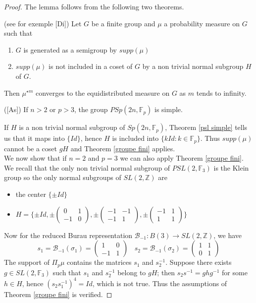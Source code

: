 \documentclass[12pt]{article}
\begin{document}
\begin{proof}
The lemma follows from the following two theorems. 
\begin{thm}\label{groupe fini}
	(see for exemple [Di])
	Let  $G$ be a finite group and $\mu$ a probability measure on $G$ such that 
	\begin{enumerate}
		\item 
$G$ is generated as a semigroup by 	$supp(\mu)$
\item $supp(\mu)$ is not included in a coset of $G$ by a non trivial normal subgroup $H$ of $G$.
\end{enumerate}
  Then $\mu^{\star m}$ converges to the equidistributed measure on $G$ as $m$ tends to infinity.
\end{thm}
\begin{thm}\label{psl simple} ([As]) If $n> 2$ or $p> 3$, the group $PSp(2n,{\mathbb{F}_p})$ is simple.
	\end{thm} 
If $H$ is a non trivial normal subgroup of $Sp(2n,\mathbb{F}_p)$, 
Theorem \ref{psl simple} tells us that it maps into $\{Id\}$, hence $H$ is included into $\{kId: k\in \mathbb{F}_p\}$. Thus $supp(\mu)$ cannot be a  coset $gH$ and Theorem \ref{groupe fini} applies.\\
We now show that if $n=2$ and $p=3$ we can also apply Theorem \ref{groupe fini}. We recall that the only non trivial normal subgroup of $PSL(2,\mathbb{F}_3)$ is the Klein group  so the only normal subgroups of $SL(2,\mathbb{Z})$ are 
\begin{itemize}
	\item the center $\{\pm Id\}$
	\item 
	$H=\{\pm Id, \pm\begin{pmatrix}
	0 & 1 \\
	-1 & 0 
	\end{pmatrix}, \pm\begin{pmatrix}
	-1 & -1 \\
	-1 & 1 
	\end{pmatrix}, \pm\begin{pmatrix}
	-1 & 1 \\
	1 & 1 
	\end{pmatrix}\}$
	\end{itemize}
Now for the reduced Burau representation ${\mathcal B}_{-1}:B(3)\longrightarrow SL(2,\mathbb{Z})$, we have
\begin{equation}\label{les generateurs}
s_1={\mathcal B}_{-1}(\sigma_1)=\begin{pmatrix}
1 & 0 \\
-1 & 1 
\end{pmatrix}\ \ \ \ s_2={\mathcal B}_{-1}(\sigma_2)=\begin{pmatrix}
1 & 1 \\
0 & 1 
\end{pmatrix}
\end{equation}
The support of $\Pi_p\mu$ contains the matrices $s_1$ and $s_2^{-1}$. Suppose there exists $g\in SL(2,\mathbb{F}_3)$ such that $s_1$ and $s_2^{-1}$ belong to $gH$; then $s_2s^{-1}=ghg^{-1}$ for some $h\in H$, hence $(s_2s_1^{-1})^4=Id$, which is not true. Thus the assumptions of Theorem \ref{groupe fini} is verified.
\end{proof}
\end{document}
